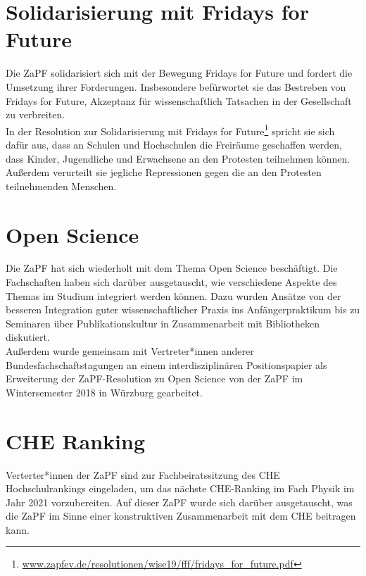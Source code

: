 \section*{Solidarisierung mit Fridays for Future} 
Die ZaPF solidarisiert sich mit der Bewegung \glqq{}Fridays for Future\grqq{} und fordert die Umsetzung ihrer Forderungen. Insbesondere befürwortet sie das Bestreben von \glqq Fridays for Future\grqq{},  Akzeptanz für wissenschaftlich Tatsachen in der Gesellschaft zu verbreiten.\\
In der Resolution zur Solidarisierung mit Fridays for Future\footnote{\href{https://zapfev.de/resolutionen/wise19/fff/fridays_for_future.pdf}{www.zapfev.de/resolutionen/wise19/fff/fridays\_for\_future.pdf}} spricht sie sich dafür aus, dass an Schulen und Hochschulen die Freiräume geschaffen werden, dass Kinder, Jugendliche und Erwachsene an den Protesten teilnehmen können. Außerdem verurteilt sie jegliche Repressionen gegen die an den Protesten teilnehmenden Menschen. 

\section*{Open Science}
Die ZaPF hat sich wiederholt mit dem Thema Open Science beschäftigt. Die Fachschaften haben sich darüber ausgetauscht, wie verschiedene Aspekte des Themas im Studium integriert werden können. Dazu wurden Ansätze von der besseren Integration guter wissenschaftlicher Praxis ins Anfängerpraktikum bis zu Seminaren über Publikationskultur in Zusammenarbeit mit Bibliotheken diskutiert.\\
Außerdem wurde gemeinsam mit Vertreter*innen anderer Bundesfachschaftstagungen an einem interdisziplinären  Positionspapier als Erweiterung der ZaPF-Resolution zu Open Science von der ZaPF im Wintersemester 2018 in Würzburg gearbeitet.

\section*{CHE Ranking}
Verterter*innen der ZaPF sind zur Fachbeiratssitzung des CHE Hochschulrankings eingeladen, um das nächste CHE-Ranking im Fach Physik im Jahr 2021 vorzubereiten. Auf dieser ZaPF wurde sich darüber ausgetauscht, was die ZaPF im Sinne einer konstruktiven Zusammenarbeit mit dem CHE beitragen kann.
